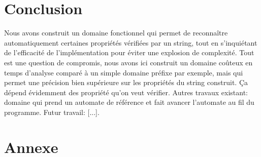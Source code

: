 \documentclass{article}
\begin{document}
\section{Conclusion} %
Nous avons construit un domaine fonctionnel qui permet de reconnaître automatiquement certaines propriétés vérifiées par un string,
tout en s'inquiétant de l'efficacité de l'implémentation pour éviter une explosion de complexité.
Tout est une question de compromis, nous avons ici construit un domaine coûteux en temps d'analyse
comparé à un simple domaine préfixe par exemple, mais qui permet une précision bien supérieure
sur les propriétés du string construit. Ça dépend évidemment des propriété qu'on veut vérifier.
Autres travaux existant: domaine qui prend un automate de référence et fait avancer l'automate au fil du programme.
Futur travail: [...].





\section{Annexe}
\end{document}

